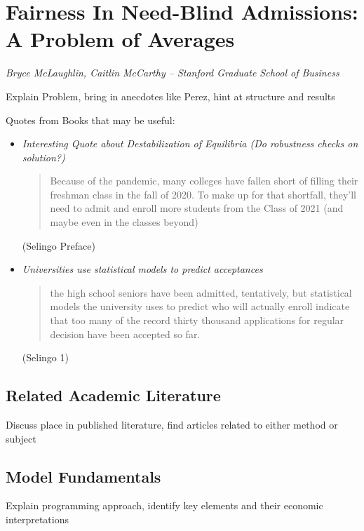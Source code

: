 \documentclass[10pt]{article}
\begin{document}
\section*{Fairness In Need-Blind Admissions: A Problem of Averages}

\textit{Bryce McLaughlin, Caitlin McCarthy -- Stanford Graduate School of Business}

\medskip

{\color{red} Explain Problem, bring in anecdotes like Perez, hint at structure and results}

{\color{blue} Quotes from Books that may be useful:

\begin{itemize}
	\item \textit{Interesting Quote about Destabilization of Equilibria (Do robustness checks on solution?)} 
	\begin{quote} Because of the pandemic, many colleges have fallen short of filling their freshman class in the fall of 2020. To make up for that shortfall, they'll need to admit and enroll more students from the Class of 2021 (and maybe even in the classes beyond)
	\end{quote} (Selingo Preface)
	\item \textit{Universities use statistical models to predict acceptances}
	\begin{quote}
	the high school seniors have been admitted, tentatively, but statistical models the university uses to predict who will actually enroll indicate that too many of the record thirty thousand applications for regular decision have been accepted so far.
	\end{quote}
	(Selingo 1)

\end{itemize}}

\subsection*{Related Academic Literature}

{\color{red} Discuss place in published literature, find articles related to either method or subject}

\subsection*{Model Fundamentals}

{\color{red} Explain programming approach, identify key elements and their economic interpretations}
\end{document}
